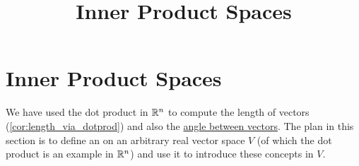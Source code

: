 \documentclass{ximera}
\title{Inner Product Spaces} \license{CC BY-NC-SA 4.0}
\begin{document}
\begin{abstract}
 \end{abstract}
\maketitle

\section*{Inner Product Spaces}

We have used the dot product in $\mathbb{R}^n$ to compute the length of vectors (\ref{cor:length_via_dotprod}) and also the \href{https://ximera.osu.edu/oerlinalg/LinearAlgebra/VEC-0060/main}{angle between vectors}. The plan in this section is to define an  on an arbitrary real vector space $V$ (of which the dot product is an example in $\mathbb{R}^n$) and use it to introduce these concepts in $V$.
\end{document}
